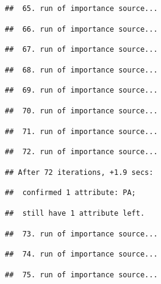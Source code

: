 \documentclass[
]{article}
\begin{document}
\begin{verbatim}
##  65. run of importance source...
\end{verbatim}

\begin{verbatim}
##  66. run of importance source...
\end{verbatim}

\begin{verbatim}
##  67. run of importance source...
\end{verbatim}

\begin{verbatim}
##  68. run of importance source...
\end{verbatim}

\begin{verbatim}
##  69. run of importance source...
\end{verbatim}

\begin{verbatim}
##  70. run of importance source...
\end{verbatim}

\begin{verbatim}
##  71. run of importance source...
\end{verbatim}

\begin{verbatim}
##  72. run of importance source...
\end{verbatim}

\begin{verbatim}
## After 72 iterations, +1.9 secs:
\end{verbatim}

\begin{verbatim}
##  confirmed 1 attribute: PA;
\end{verbatim}

\begin{verbatim}
##  still have 1 attribute left.
\end{verbatim}

\begin{verbatim}
##  73. run of importance source...
\end{verbatim}

\begin{verbatim}
##  74. run of importance source...
\end{verbatim}

\begin{verbatim}
##  75. run of importance source...
\end{verbatim}
\end{document}
